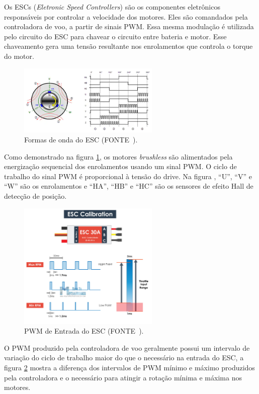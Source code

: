 \documentclass[12pt,a4paper,oneside]{book}
\begin{document}
Os ESCs (\textit{Eletronic Speed Controllers}) são os componentes eletrônicos responsáveis por controlar a velocidade dos motores. Eles são comandados pela controladora de voo, a partir de sinais PWM. Essa mesma modulação é utilizada pelo circuito do ESC para chavear o circuito entre bateria e motor. Esse chaveamento gera uma tensão resultante nos enrolamentos que controla o torque do motor. 
%
\begin{figure}[H]
  \centering
  \includegraphics[width=0.6\textwidth]{Images/introducao/esc_wave_form.png}
  \caption{Formas de onda do ESC (FONTE~\cite{url:esc_wave_form}).}
  \label{fig:esc_wave_form.png.0}
\end{figure}
%
Como demonstrado na figura \ref{fig:esc_wave_form.png.0}, os motores \textit{brushless} são alimentados pela energização sequencial dos enrolamentos usando um sinal PWM. O ciclo de trabalho do sinal PWM é proporcional à tensão do drive. Na figura , “U”, “V” e “W” são os enrolamentos e “HA”, “HB” e “HC” são os sensores de efeito Hall de detecção de posição.
%
\begin{figure}[H]
  \centering
  \includegraphics[width=0.6\textwidth]{Images/introducao/esc_pwm.jpg}
  \caption{PWM de Entrada do ESC (FONTE~\cite{url:esc_pwm}).}
  \label{fig:esc_pwm.jpg.0}
\end{figure}
%
O PWM produzido pela controladora de voo geralmente possui um intervalo de variação do ciclo de trabalho maior do que o necessário na entrada do ESC, a figura \ref{fig:esc_pwm.jpg.0} mostra a diferença dos intervalos de PWM mínimo e máximo produzidos pela controladora e o necessário para atingir a rotação mínima e máxima nos motores.
\end{document}
